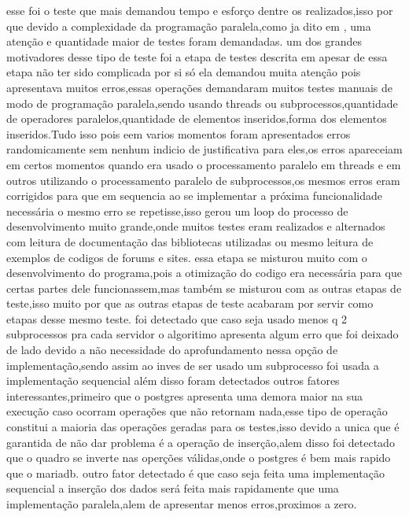 \documentclass[
	12pt,				%
	openright,			%
	oneside,			%
	a4paper,			%
	english,			%
	french,				%
	spanish,			%
	brazil,				%
	]{abntex2}
\begin{document}
esse foi o teste que mais demandou tempo e esforço dentre os realizados,isso por que devido a complexidade da programação paralela,como ja dito em , uma atenção e quantidade maior de testes foram demandadas.
um dos grandes motivadores desse tipo de teste foi a etapa de testes descrita em  apesar de essa etapa não ter sido complicada por si só ela demandou muita atenção pois apresentava muitos erros,essas operações demandaram muitos testes manuais de modo de programação paralela,sendo usando threads ou subprocessos,quantidade de operadores paralelos,quantidade de elementos inseridos,forma dos elementos inseridos.Tudo isso pois eem varios momentos foram apresentados erros randomicamente sem nenhum indicio de justificativa para eles,os erros apareceiam em certos momentos quando era usado o processamento paralelo em threads e em outros utilizando o processamento paralelo de subprocessos,os mesmos erros eram corrigidos para que em sequencia ao se implementar a próxima funcionalidade necessária o mesmo erro se repetisse,isso gerou um loop do processo de desenvolvimento muito grande,onde muitos testes eram realizados e alternados com leitura de documentação das bibliotecas utilizadas ou mesmo leitura de exemplos de codigos de forums e sites.
essa etapa se misturou muito com o desenvolvimento do programa,pois a otimização do codigo era necessária para que certas partes dele funcionassem,mas também se misturou com as outras etapas de teste,isso muito por que as outras etapas de teste acabaram por servir como etapas desse mesmo teste.
foi detectado que caso seja usado menos q 2 subprocessos pra cada servidor o algoritimo apresenta algum erro que foi deixado de lado devido a não necessidade do aprofundamento nessa opção de implementação,sendo assim ao inves de ser usado um subprocesso foi usada a implementação sequencial
além disso foram detectados outros fatores interessantes,primeiro que o postgres apresenta uma demora maior na sua execução caso ocorram operações que não retornam nada,esse tipo de operação constitui a maioria das operações geradas para os testes,isso devido a unica que é garantida de não dar problema é a operação de inserção,alem disso foi detectado que o quadro se inverte nas operções válidas,onde o postgres é bem mais rapido que o mariadb.
outro fator detectado é que caso seja feita uma implementação sequencial a inserção dos dados será feita mais rapidamente que uma implementação paralela,alem de apresentar menos erros,proximos a zero.
\end{document}
